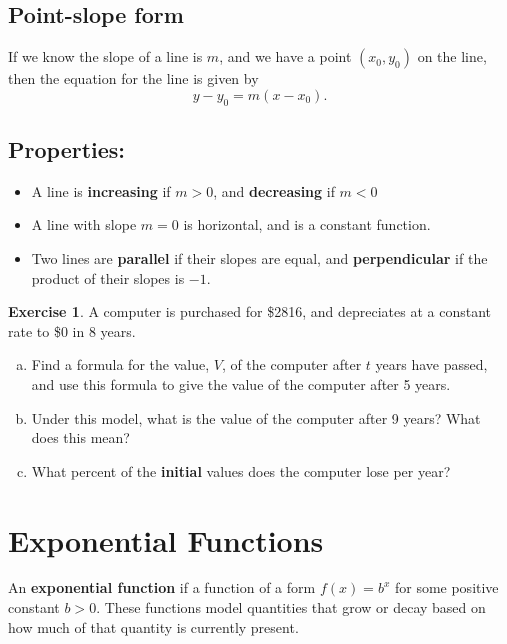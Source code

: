 \documentclass[11pt,reqno,final]{amsart}
\numberwithin{equation}{section}
\numberwithin{figure}{section}
\theoremstyle{definition} %
\newtheorem{exercise}{Exercise}
\begin{document}
\subsection*{Point-slope form}
If we know the slope of a line is $m$, and we have a point $(x_0,y_0)$ on the line,
then the equation for the line is given by
\[
        y - y_0 = m(x-x_0).
\]

\subsection*{Properties:}
\begin{itemize}
\item A line is \textbf{increasing} if $m > 0$, and \textbf{decreasing} if $m < 0$
\item A line with slope $m = 0$ is horizontal, and is a constant function.
\item Two lines are \textbf{parallel} if their slopes are equal, and \textbf{perpendicular} if the product of their slopes is $-1$.
\end{itemize}


\begin{exercise}
        \label{computerex}
        A computer is purchased for \$2816, and depreciates at a constant rate to \$0 in 8 years.
        \begin{enumerate}[(a)]
        \item  Find a formula for the value, $V$, of the computer after $t$ years have passed, and
                use this formula to give the value of the computer after 5 years.
                \vfill
                \vfill
        \item Under this model, what is the value of the computer after 9 years? What does this mean?
                \vfill
        \item What percent of the \textbf{initial} values does the computer lose per year?
                \vfill
        \end{enumerate}
\end{exercise}

\newpage

\section{Exponential Functions}

\begin{framed}
        An \textbf{exponential function} if a function of a form $f(x) = b^x$ for some positive constant $b > 0$.
        These functions model quantities that grow or decay based on how much of that quantity is currently present.
\end{framed}
\end{document}
